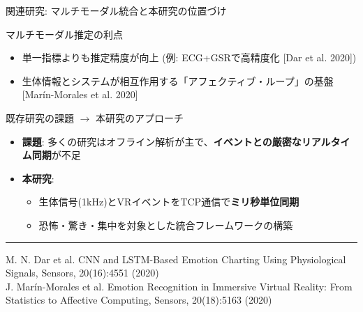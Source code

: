 \documentclass[aspectratio=169,10pt]{beamer}
\begin{document}
\begin{frame}{関連研究: マルチモーダル統合と本研究の位置づけ}
\begin{block}{マルチモーダル推定の利点}
\begin{itemize}
\item 単一指標よりも推定精度が向上 (例: ECG+GSRで高精度化 [Dar et al. 2020])
\item 生体情報とシステムが相互作用する「アフェクティブ・ループ」の基盤 [Marín-Morales et al. 2020]
\end{itemize}
\end{block}

\begin{alertblock}{既存研究の課題 $\rightarrow$ 本研究のアプローチ}
\begin{itemize}
\item \textbf{課題}: 多くの研究はオフライン解析が主で、\textbf{イベントとの厳密なリアルタイム同期}が不足
\item \textbf{本研究}: 
\begin{itemize}
\item 生体信号(1kHz)とVRイベントをTCP通信で\textbf{ミリ秒単位同期}
\item 恐怖・驚き・集中を対象とした統合フレームワークの構築
\end{itemize}
\end{itemize}
\end{alertblock}

\vspace{0.2cm}
\hrule
\vspace{0.1cm}
\tiny
\noindent [Dar et al. 2020] M. N. Dar et al. CNN and LSTM-Based Emotion Charting Using Physiological Signals, Sensors, 20(16):4551 (2020)\\
 J. Marín-Morales et al. Emotion Recognition in Immersive Virtual Reality: From Statistics to Affective Computing, Sensors, 20(18):5163 (2020)
\end{frame}
\end{document}
